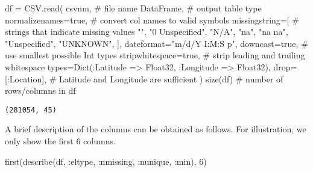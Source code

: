 \documentclass[
  12pt]{article}
\newenvironment{Shaded}{\begin{snugshade}}{\end{snugshade}}
\newcommand{\CommentTok}[1]{\textcolor[rgb]{0.37,0.37,0.37}{#1}}
\newcommand{\ConstantTok}[1]{\textcolor[rgb]{0.56,0.35,0.01}{#1}}
\newcommand{\DataTypeTok}[1]{\textcolor[rgb]{0.68,0.00,0.00}{#1}}
\newcommand{\FloatTok}[1]{\textcolor[rgb]{0.68,0.00,0.00}{#1}}
\newcommand{\FunctionTok}[1]{\textcolor[rgb]{0.28,0.35,0.67}{#1}}
\newcommand{\NormalTok}[1]{\textcolor[rgb]{0.00,0.23,0.31}{#1}}
\newcommand{\OperatorTok}[1]{\textcolor[rgb]{0.37,0.37,0.37}{#1}}
\newcommand{\StringTok}[1]{\textcolor[rgb]{0.13,0.47,0.30}{#1}}
\begin{document}
\begin{Shaded}
\begin{Highlighting}[]
\NormalTok{df }\OperatorTok{=}\NormalTok{ CSV.}\FunctionTok{read}\NormalTok{(}
\NormalTok{    csvnm,                }\CommentTok{\# file name}
\NormalTok{    DataFrame,            }\CommentTok{\# output table type}
\NormalTok{    normalizenames}\OperatorTok{=}\ConstantTok{true}\NormalTok{,  }\CommentTok{\# convert col names to valid symbols}
\NormalTok{    missingstring}\OperatorTok{=}\NormalTok{[       }\CommentTok{\# strings that indicate missing values}
        \StringTok{""}\NormalTok{,}
        \StringTok{"0 Unspecified"}\NormalTok{,}
        \StringTok{"N/A"}\NormalTok{,}
        \StringTok{"na"}\NormalTok{,}
        \StringTok{"na na"}\NormalTok{,}
        \StringTok{"Unspecified"}\NormalTok{,}
        \StringTok{"UNKNOWN"}\NormalTok{,}
\NormalTok{    ],}
\NormalTok{    dateformat}\OperatorTok{=}\StringTok{"m/d/Y I:M:S p"}\NormalTok{,}
\NormalTok{    downcast}\OperatorTok{=}\ConstantTok{true}\NormalTok{,        }\CommentTok{\# use smallest possible Int types }
\NormalTok{    stripwhitespace}\OperatorTok{=}\ConstantTok{true}\NormalTok{, }\CommentTok{\# strip leading and trailing whitespace}
\NormalTok{    types}\OperatorTok{=}\FunctionTok{Dict}\NormalTok{(}\OperatorTok{:}\NormalTok{Latitude }\OperatorTok{=\textgreater{}} \DataTypeTok{Float32}\NormalTok{, }\OperatorTok{:}\NormalTok{Longitude }\OperatorTok{=\textgreater{}} \DataTypeTok{Float32}\NormalTok{),}
\NormalTok{    drop}\OperatorTok{=}\NormalTok{[}\OperatorTok{:}\NormalTok{Location],     }\CommentTok{\# Latitude and Longitude are sufficient}
\NormalTok{)}
\FunctionTok{size}\NormalTok{(df)                  }\CommentTok{\# number of rows/columns in df}
\end{Highlighting}
\end{Shaded}

\begin{verbatim}
(281054, 45)
\end{verbatim}

A brief description of the columns can be obtained as follows. For
illustration, we only show the first 6 columns.

\begin{Shaded}
\begin{Highlighting}[]
\FunctionTok{first}\NormalTok{(}\FunctionTok{describe}\NormalTok{(df, }\OperatorTok{:}\NormalTok{eltype, }\OperatorTok{:}\NormalTok{nmissing, }\OperatorTok{:}\NormalTok{nunique, }\OperatorTok{:}\NormalTok{min), }\FloatTok{6}\NormalTok{)}
\end{Highlighting}
\end{Shaded}
\end{document}
